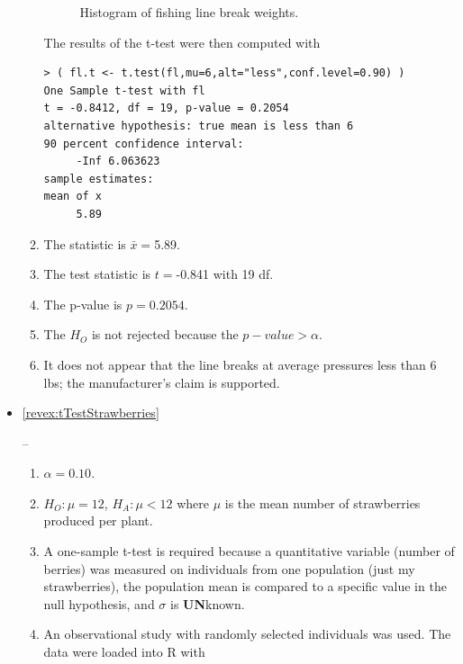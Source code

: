 \documentclass[10pt,openany]{book}\usepackage[]{graphicx}\usepackage[]{color}
\makeatletter
\newenvironment{kframe}{%
 \def\at@end@of@kframe{}%
 \ifinner\ifhmode%
  \def\at@end@of@kframe{\end{minipage}}%
  \begin{minipage}{\columnwidth}%
 \fi\fi%
 \def\FrameCommand##1{\hskip\@totalleftmargin \hskip-\fboxsep
 \colorbox{shadecolor}{##1}\hskip-\fboxsep
     \hskip-\linewidth \hskip-\@totalleftmargin \hskip\columnwidth}%
 \MakeFramed {\advance\hsize-\width
   \@totalleftmargin\z@ \linewidth\hsize
   \@setminipage}}%
 {\par\unskip\endMakeFramed%
 \at@end@of@kframe}
\newenvironment{knitrout}{}{} %
\makeatother
\begin{document}
\begin{itemize}
\begin{enumerate}
\begin{knitrout}
\begin{figure}[hbtp]
{}

\caption[Histogram of fishing line break weights]{Histogram of fishing line break weights.}\label{fig:FishingLineHist}
\end{figure}


\end{knitrout}
The results of the t-test were then computed with
\begin{knitrout}
\color{fgcolor}\begin{kframe}
\begin{verbatim}
> ( fl.t <- t.test(fl,mu=6,alt="less",conf.level=0.90) )
One Sample t-test with fl 
t = -0.8412, df = 19, p-value = 0.2054
alternative hypothesis: true mean is less than 6 
90 percent confidence interval:
     -Inf 6.063623 
sample estimates:
mean of x 
     5.89 
\end{verbatim}
\end{kframe}
\end{knitrout}
      \item The statistic is $\bar{x}=$5.89.
      \item The test statistic is $t=$-0.841 with 19 df.
      \item The p-value is $p=0.2054$.
      \item The $H_{O}$ is not rejected because the $p-value>\alpha$.
      \item It does not appear that the line breaks at average pressures less than 6 lbs; the manufacturer's claim is supported.
    \end{enumerate}
  \item \hypertarget{ans:tTestStrawberries}{\ref{revex:tTestStrawberries}} --
    \begin{enumerate}
      \item $\alpha=0.10$.
      \item $H_{O}:\mu=12$, $H_{A}:\mu<12$ where $\mu$ is the mean number of strawberries produced per plant.
      \item A one-sample t-test is required because a quantitative variable (number of berries) was measured on individuals from one population (just my strawberries), the population mean is compared to a specific value in the null hypothesis, and $\sigma$ is \textbf{UN}known.
      \item An observational study with randomly selected individuals was used.  The data were loaded into R with
\begin{knitrout}
\color{fgcolor}\begin{kframe}

\end{kframe}
\end{knitrout}
\end{enumerate}
\end{itemize}
\end{document}
